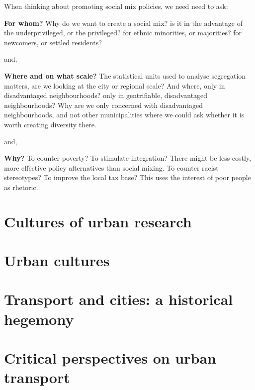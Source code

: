 \documentclass{article}
\begin{document}
When thinking about promoting social mix policies, we need need to ask:

\textbf{For whom?}
Why do we want to create a social mix? is it in the advantage of the underprivileged, or the privileged? for ethnic minorities, or majorities? for newcomers, or settled residents?

and, 

\textbf{Where and on what scale?}
The statistical units used to analyse segregation matters, are we looking at the city or regional scale? And where, only in disadvantaged neighbourhoods? only in gentrifiable, disadvantaged neighbourhoods? 
Why are we only concerned with disadvantaged neighbourhoods, and not other municipalities where we could ask whether it is worth creating diversity there.

and,

\textbf{Why?}
To counter poverty? To stimulate integration? There might be less costly, more effective policy alternatives than social mixing.
To counter racist stereotypes? To improve the local tax base? This uses the interest of poor people as rhetoric.


\section{Cultures of urban research}


\section{Urban cultures}


\section{Transport and cities: a historical hegemony}


\section{Critical perspectives on urban transport}
\end{document}
